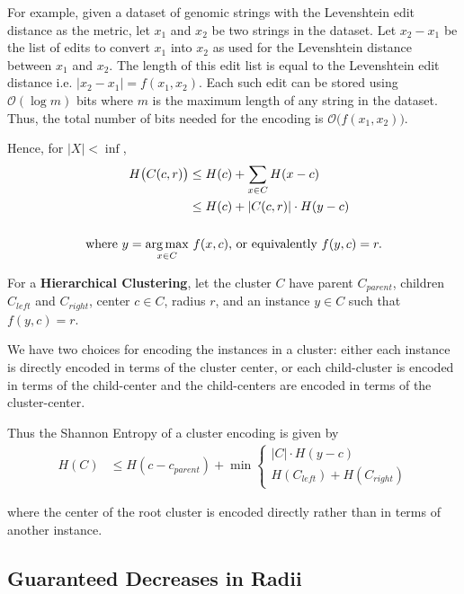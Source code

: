For example, given a dataset of genomic strings with the Levenshtein edit distance as the metric, let $x_1$ and $x_2$ be two strings in the dataset.
Let $x_2 - x_1$ be the list of edits to convert $x_1$ into $x_2$ as used for the Levenshtein distance between $x_1$ and $x_2$.
The length of this edit list is equal to the Levenshtein edit distance i.e. $|x_2 - x_1| = f(x_1, x_2)$.
Each such edit can be stored using $\mathcal{O}(\log m)$ bits where $m$ is the maximum length of any string in the dataset.
Thus, the total number of bits needed for the encoding is $\mathcal{O} \big( f(x_1, x_2) \big)$.

Hence, for $|X| < \inf$,
\begin{align*}
    H \big( C(c, r) \big) &\leq H(c) + \sum_{x \in C} H(x - c) \\
    &\leq H(c) + |C(c, r)| \cdot H(y - c) \\ \\
    \text{where} \ y = \operatorname*{arg\,max}_{x \in C}& \ f(x, c) \text{, or equivalently} \ f(y, c) = r.
\end{align*}

For a \textbf{Hierarchical Clustering}, let the cluster $C$ have parent $C_{parent}$, children $C_{left}$ and $C_{right}$, center $c \in C$, radius $r$, and an instance $y \in C$ such that $f(y, c) = r$.

We have two choices for encoding the instances in a cluster:
either each instance is directly encoded in terms of the cluster center, 
or each child-cluster is encoded in terms of the child-center and the child-centers are encoded in terms of the cluster-center.

Thus the Shannon Entropy of a cluster encoding is given by
\begin{align}
    \label{eq:hierarchical-shannon-entropy}
    H(C) &\leq H(c - c_{parent}) + \min \begin{cases}
        |C| \cdot H(y - c) \\
        H(C_{left}) + H(C_{right})
    \end{cases}
\end{align}

where the center of the root cluster is encoded directly rather than in terms of another instance.


\subsection{Guaranteed Decreases in Radii}
\label{subsec:methods:radii-decrease}

